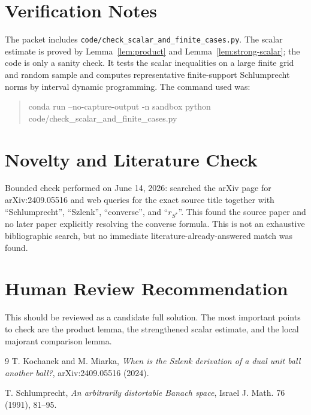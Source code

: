 \documentclass[11pt]{article}
\begin{document}
\section*{Verification Notes}

The packet includes \texttt{code/check\_scalar\_and\_finite\_cases.py}.  The
scalar estimate is proved by Lemma~\ref{lem:product} and
Lemma~\ref{lem:strong-scalar}; the code is only a sanity check.  It tests
the scalar inequalities on a large finite grid and random sample and computes
representative finite-support Schlumprecht norms by interval dynamic
programming.  The command used was:
\begin{quote}\small\ttfamily
conda run --no-capture-output -n sandbox python\\
code/check\_scalar\_and\_finite\_cases.py
\end{quote}

\section*{Novelty and Literature Check}

Bounded check performed on June 14, 2026: searched the arXiv page for
arXiv:2409.05516 and web queries for the exact source title together with
``Schlumprecht'', ``Szlenk'', ``converse'', and ``$r_{S^*}$''.  This found the
source paper and no later paper explicitly resolving the converse formula.
This is not an exhaustive bibliographic search, but no immediate
literature-already-answered match was found.

\section*{Human Review Recommendation}

This should be reviewed as a candidate full solution.  The most important
points to check are the product lemma, the strengthened scalar estimate, and
the local majorant comparison lemma.

\begin{thebibliography}{9}
T. Kochanek and M. Miarka,
\emph{When is the Szlenk derivation of a dual unit ball another ball?},
arXiv:2409.05516 (2024).

T. Schlumprecht,
\emph{An arbitrarily distortable Banach space},
Israel J. Math. 76 (1991), 81--95.
\end{thebibliography}
\end{document}
